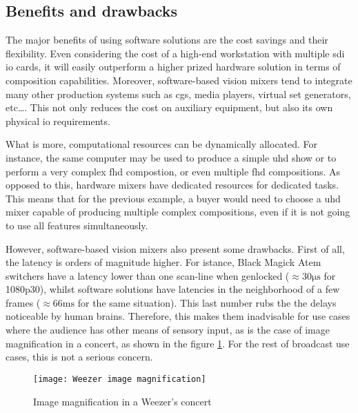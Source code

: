 \documentclass[../main.tex]{subfiles}
\begin{document}
\subsection{Benefits and drawbacks}
The major benefits of using software solutions are the cost savings and their flexibility. Even considering the cost of a high-end workstation with multiple \gls{sdi} \gls{io} cards, it will easily outperform a higher prized hardware solution in terms of composition capabilities. Moreover, software-based vision mixers tend to integrate many other production systems such as \glspl{cg}, media players, virtual set generators, etc\dots\cite{tricasterManual}\cite{vmixManual}. This not only reduces the cost on auxiliary equipment, but also its own physical \gls{io} requirements.\newline

What is more, computational resources can be dynamically allocated. For instance, the same computer may be used to produce a simple \gls{uhd} show or to perform a very complex \gls{fhd} compostion, or even multiple \gls{fhd} compositions. As opposed to this, hardware mixers have dedicated resources for dedicated tasks. This means that for the previous example, a buyer would need to choose a \gls{uhd} mixer capable of producing multiple complex compositions, even if it is not going to use all features simultaneously.\newline

However, software-based vision mixers also present some drawbacks. First of all, the latency is orders of magnitude higher. For istance, Black Magick Atem switchers have a latency lower than one scan-line when genlocked\cite{atemManual} ($\approx 30 \si{\micro\second}$ for 1080p30), whilst software solutions have latencies in the neighborhood of a few frames\cite{tricasterManual} ($\approx 66 \si{\milli\second}$ for the same situation). This last number rubs the the delays noticeable by human brains. Therefore, this makes them inadvisable for use cases where the audience has other means of sensory input, as is the case of image magnification in a concert, as shown in the figure \ref{fig:02:imag}. For the rest of broadcast use cases, this is not a serious concern.\newline

\begin{figure}[htbp]
    \centering
    \texttt{[image: Weezer image magnification]}
    \caption{Image magnification in a Weezer's concert}
    \label{fig:02:imag}
\end{figure}
\end{document}
